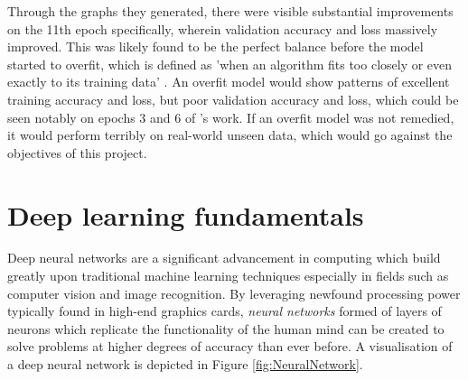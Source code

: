 \documentclass[12pt]{report}
\begin{document}
\noindent Through the graphs they generated, there were visible substantial improvements on the 11th epoch specifically, wherein validation 
accuracy and loss massively improved. This was likely found to be the perfect balance before the model started to overfit, which is defined 
as 'when an algorithm fits too closely or even exactly to its training data' \autocite{ibmWhatOverfittingIBM2021}. An overfit model would 
show patterns of excellent training accuracy and loss, but poor validation accuracy and loss, which could be seen notably on epochs 3 and 6
of \textcite{mathurPneumoniaDetectionUsing2020}'s work. If an overfit model was not remedied, it would perform terribly on real-world unseen 
data, which would go against the objectives of this project.  


\chapter{Deep learning fundamentals}




Deep neural networks are a significant advancement in computing which build greatly upon traditional 
machine learning techniques especially in fields such as computer vision and image recognition. By leveraging newfound processing power 
typically found in high-end graphics cards, \textit{neural networks} formed of layers of neurons which replicate the functionality of 
the human mind can be created to solve problems at higher degrees of accuracy than ever before. A visualisation of a deep neural network 
is depicted in Figure \ref{fig:NeuralNetwork}.
\end{document}
